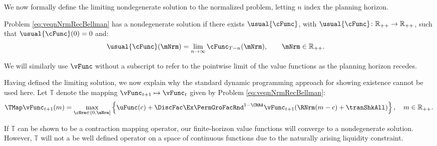 \documentclass[BufferStockTheory]{subfiles}
\begin{document}

\hypertarget{sensible}{}\hypertarget{useful}{}
\hypertarget{Definition-of-a-Nondegenerate-Solution and Bellman}{}
We now formally define the limiting nondegenerate solution to the normalized problem, letting $n$ index the planning horizon. 
\begin{definition}
Problem \ref{eq:veqnNrmRecBellman} has a nondegenerate solution if there exists $ \usual{\cFunc}$, with $\usual{\cFunc}\colon \mathbb{R}_{++}\rightarrow \mathbb{R}_{++}$, such that $\usual{\cFunc}(0) = 0$ and:
%
\begin{align*}
  \usual{\cFunc}(\mNrm)  & =  \lim_{n \rightarrow \infty} \cFunc_{T-n}(\mNrm), \qquad \mNrm \in \mathbb{R}_{++} \notag.
\end{align*}
\end{definition}

We will similarly use $\vFunc$ without a subscript to refer to the pointwise limit of the value functions as the planning horizon recedes. 

\hypertarget{Stationary-Bellman-Operator}{}

Having defined the limiting solution, we now explain why the standard dynamic programming approach for showing existence cannot be used here. Let $\mathbb{T}$ denote the mapping $\vFunc_{t+1}\mapsto \vFunc_{t}$ given by Problem \ref{eq:veqnNrmRecBellman}:
%
%
\begin{equation}\label{eq:maintmap}
\TMap \vFunc_{t+1}(m) = \max_{\cNrm \in
    (0, \mNrm]
  }  \left\{\uFunc(c) + \DiscFac\Ex\PermGroFacRnd^{1-\CRRA}\vFunc_{t+1}(\RNrm(m - c) + \tranShkAll)\right\}, \quad m\in \mathbb{R}_{++}.  
\end{equation}

If $\mathbb{T}$  can be shown to be a contraction mapping operator, our finite-horizon value functions will converge to a nondegenerate solution. However, $\mathbb{T}$ will not a be well defined operator on a space of continuous functions due to the naturally arising liquidity constraint. 
\end{document}
